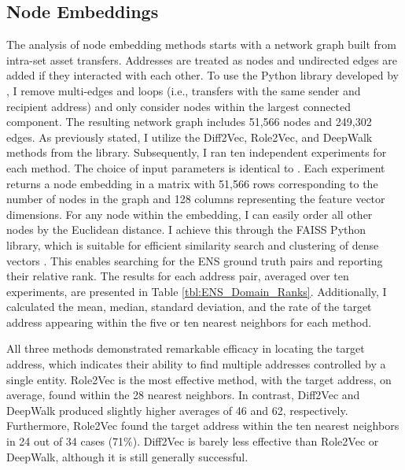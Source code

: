 \documentclass[12pt,a4paper,titlepage,oneside,english]{article}
\begin{document}
\subsection{Node Embeddings}
The analysis of node embedding methods starts with a network graph built from intra-set asset transfers. Addresses are treated as nodes and undirected edges are added if they interacted with each other. \newline
To use the Python library developed by \cite{karateclub}, I remove multi-edges and loops (i.e., transfers with the same sender and recipient address) and only consider nodes within the largest connected component. The resulting network graph includes 51,566 nodes and 249,302 edges. As previously stated, I utilize the Diff2Vec, Role2Vec, and DeepWalk methods from the library. \newline
Subsequently, I ran ten independent experiments for each method. The choice of input parameters is identical to \cite{Beres2020}. Each experiment returns a node embedding in a matrix with 51,566 rows corresponding to the number of nodes in the graph and 128 columns representing the feature vector dimensions. \newline
For any node within the embedding, I can easily order all other nodes by the Euclidean distance. I achieve this through the FAISS Python library, which is suitable for efficient similarity search and clustering of dense vectors \citep{johnson2019faiss}.\newline 
This enables searching for the ENS ground truth pairs and reporting their relative rank. The results for each address pair, averaged over ten experiments, are presented in Table \ref{tbl:ENS_Domain_Ranks}. Additionally, I calculated the mean, median, standard deviation, and the rate of the target address appearing within the five or ten nearest neighbors for each method.

All three methods demonstrated remarkable efficacy in locating the target address, which indicates their ability to find multiple addresses controlled by a single entity.
Role2Vec is the most effective method, with the target address, on average, found within the 28 nearest neighbors. In contrast, Diff2Vec and DeepWalk produced slightly higher averages of 46 and 62, respectively. Furthermore, Role2Vec found the target address within the ten nearest neighbors in 24 out of 34 cases (71\%). Diff2Vec is barely less effective than Role2Vec or DeepWalk, although it is still generally successful. \newline 
\end{document}
